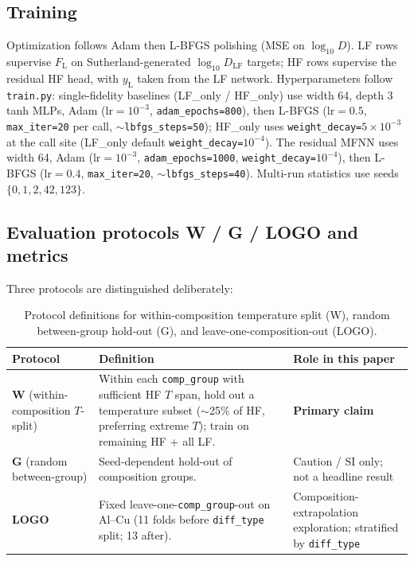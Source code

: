 \documentclass[review,12pt]{elsarticle}
\begin{document}
\subsection{Training}
\label{sec:training}

Optimization follows Adam then L-BFGS polishing (MSE on $\log_{10} D$). LF rows supervise $F_{\mathrm{L}}$ on Sutherland-generated $\log_{10} D_{\mathrm{LF}}$ targets; HF rows supervise the residual HF head, with $y_{\mathrm{L}}$ taken from the LF network. Hyperparameters follow \texttt{train.py}: single-fidelity baselines (LF\_only / HF\_only) use width 64, depth 3 tanh MLPs, Adam ($\mathrm{lr}=10^{-3}$, \texttt{adam\_epochs=800}), then L-BFGS ($\mathrm{lr}=0.5$, \texttt{max\_iter=20} per call, $\sim$\texttt{lbfgs\_steps=50}); HF\_only uses \texttt{weight\_decay=}$5\times 10^{-3}$ at the call site (LF\_only default \texttt{weight\_decay=}$10^{-4}$). The residual MFNN uses width 64, Adam ($\mathrm{lr}=10^{-3}$, \texttt{adam\_epochs=1000}, \texttt{weight\_decay=}$10^{-4}$), then L-BFGS ($\mathrm{lr}=0.4$, \texttt{max\_iter=20}, $\sim$\texttt{lbfgs\_steps=40}). Multi-run statistics use seeds $\{0,1,2,42,123\}$.

\subsection{Evaluation protocols W / G / LOGO and metrics}
\label{sec:protocols}

Three protocols are distinguished deliberately:

\begin{table}[t]
\centering
\caption{Protocol definitions for within-composition temperature split (W), random between-group hold-out (G), and leave-one-composition-out (LOGO).}
\label{tab:protocols}
\begin{tabular}{@{}lll@{}}
\toprule
Protocol & Definition & Role in this paper \\
\midrule
\textbf{W} (within-composition $T$-split)
  & Within each \texttt{comp\_group} with sufficient HF $T$ span, hold out a temperature subset ($\sim$25\% of HF, preferring extreme $T$); train on remaining HF + all LF.
  & \textbf{Primary claim} \\
\textbf{G} (random between-group)
  & Seed-dependent hold-out of composition groups.
  & Caution / SI only; not a headline result \\
\textbf{LOGO}
  & Fixed leave-one-\texttt{comp\_group}-out on Al--Cu (11 folds before \texttt{diff\_type} split; 13 after).
  & Composition-extrapolation exploration; stratified by \texttt{diff\_type} \\
\bottomrule
\end{tabular}
\end{table}
\end{document}

